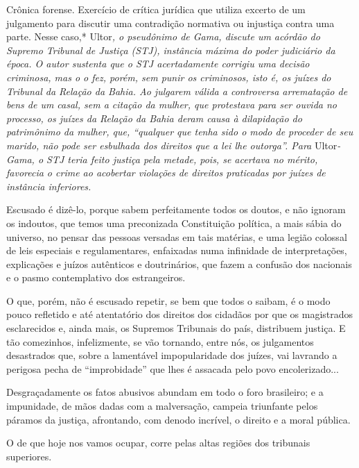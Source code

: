 \begin{didascalia}
Crônica forense. Exercício de crítica jurídica que utiliza excerto de um
julgamento para discutir uma contradição normativa ou injustiça contra
uma parte. Nesse caso,* Ultor\emph{, o pseudônimo de Gama, discute um
acórdão do Supremo Tribunal de Justiça (STJ), instância máxima do poder
judiciário da época. O autor sustenta que o STJ acertadamente corrigiu
uma decisão criminosa, mas o o fez, porém, sem punir os criminosos, isto
é, os juízes do Tribunal da Relação da Bahia. Ao julgarem válida a
controversa arrematação de bens de um casal, sem a citação da mulher,
que protestava para ser ouvida no processo, os juízes da Relação da
Bahia deram causa à dilapidação do patrimônimo da mulher, que, ``qualquer
que tenha sido o modo de proceder de seu marido, não pode ser esbulhada
dos direitos que a lei lhe outorga''. Para} Ultor\emph{-Gama, o STJ teria
feito justiça pela metade, pois, se acertava no mérito, favorecia o
crime ao acobertar violações de direitos praticadas por juízes de
instância inferiores.}
\end{didascalia}

\asterisc{}

Escusado é dizê-lo, porque sabem perfeitamente todos os doutos, e não
ignoram os indoutos, que temos uma preconizada Constituição política, a
mais sábia do universo, no pensar das pessoas versadas em tais matérias,
e uma legião colossal de leis especiais e regulamentares, enfaixadas
numa infinidade de interpretações, explicações e juízos autênticos e
doutrinários, que fazem a confusão dos nacionais e o pasmo contemplativo
dos estrangeiros.

O que, porém, não é escusado repetir, se bem que todos o saibam, é o
modo pouco refletido e até atentatório dos direitos dos cidadãos por que
os magistrados esclarecidos e, ainda mais, os Supremos Tribunais do
país, distribuem justiça. E tão comezinhos, infelizmente, se vão
tornando, entre nós, os julgamentos desastrados que, sobre a lamentável
impopularidade dos juízes, vai lavrando a perigosa pecha de
``improbidade'' que lhes é assacada pelo povo encolerizado...

Desgraçadamente os fatos abusivos abundam em todo o foro brasileiro; e a
impunidade, de mãos dadas com a malversação, campeia triunfante pelos
páramos da justiça, afrontando, com denodo incrível, o direito e a moral
pública.

O de que hoje nos vamos ocupar, corre pelas altas regiões dos tribunais
superiores.

